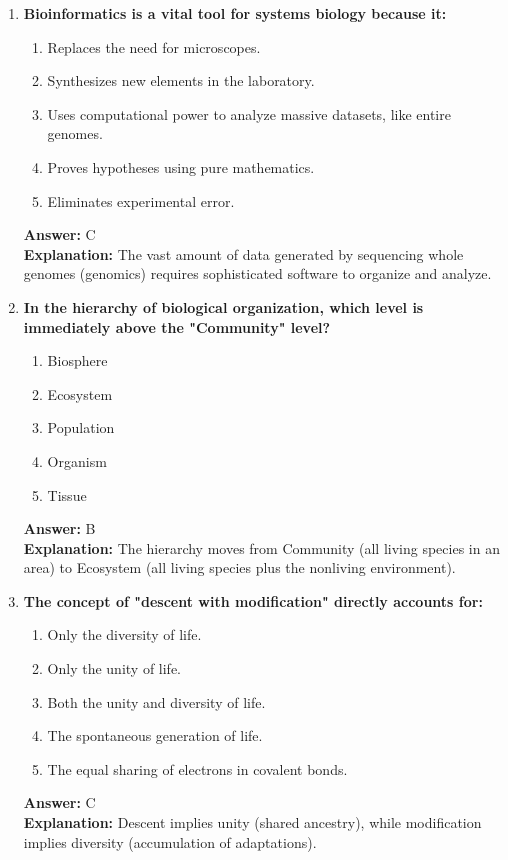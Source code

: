 \documentclass[11pt, a4paper]{article}
\begin{document}
\begin{enumerate}
\item \textbf{Bioinformatics is a vital tool for systems biology because it:}
\begin{enumerate}[label=\Alph*.]
    \item Replaces the need for microscopes.
    \item Synthesizes new elements in the laboratory.
    \item Uses computational power to analyze massive datasets, like entire genomes.
    \item Proves hypotheses using pure mathematics.
    \item Eliminates experimental error.
\end{enumerate}
\textbf{Answer:} C \\
\textbf{Explanation:} The vast amount of data generated by sequencing whole genomes (genomics) requires sophisticated software to organize and analyze.

\item \textbf{In the hierarchy of biological organization, which level is immediately above the "Community" level?}
\begin{enumerate}[label=\Alph*.]
    \item Biosphere
    \item Ecosystem
    \item Population
    \item Organism
    \item Tissue
\end{enumerate}
\textbf{Answer:} B \\
\textbf{Explanation:} The hierarchy moves from Community (all living species in an area) to Ecosystem (all living species plus the nonliving environment).

\item \textbf{The concept of "descent with modification" directly accounts for:}
\begin{enumerate}[label=\Alph*.]
    \item Only the diversity of life.
    \item Only the unity of life.
    \item Both the unity and diversity of life.
    \item The spontaneous generation of life.
    \item The equal sharing of electrons in covalent bonds.
\end{enumerate}
\textbf{Answer:} C \\
\textbf{Explanation:} Descent implies unity (shared ancestry), while modification implies diversity (accumulation of adaptations).


\end{enumerate}
\end{document}
